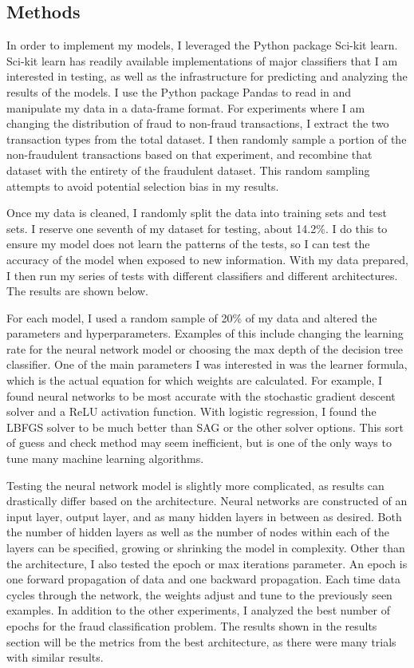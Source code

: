 \documentclass[midd]{thesis}
\begin{document}
\subsection{Methods}

In order to implement my models, I leveraged the Python package Sci-kit learn. Sci-kit learn has readily available implementations of major classifiers that I am interested in testing, as well as the infrastructure for predicting and analyzing the results of the models. I use the Python package Pandas to read in and manipulate my data in a data-frame format. For experiments where I am changing the distribution of fraud to non-fraud transactions, I extract the two transaction types from the total dataset. I then randomly sample a portion of the non-fraudulent transactions based on that experiment, and recombine that dataset with the entirety of the fraudulent dataset. This random sampling attempts to avoid potential selection bias in my results. 

Once my data is cleaned, I randomly split the data into training sets and test sets. I reserve one seventh of my dataset for testing, about 14.2\%. I do this to ensure my model does not learn the patterns of the tests, so I can test the accuracy of the model when exposed to new information. With my data prepared, I then run my series of tests with different classifiers and different architectures. The results are shown below. 

For each model, I used a random sample of 20\% of my data and altered the parameters and hyperparameters. Examples of this include changing the learning rate for the neural network model or choosing the max depth of the decision tree classifier. One of the main parameters I was interested in was the learner formula, which is the actual equation for which weights are calculated. For example, I found neural networks to be most accurate with the stochastic gradient descent solver and a ReLU activation function. With logistic regression, I found the LBFGS solver to be much better than SAG or the other solver options. This sort of guess and check method may seem inefficient, but is one of the only ways to tune many machine learning algorithms.

Testing the neural network model is slightly more complicated, as results can drastically differ based on the architecture. Neural networks are constructed of an input layer, output layer, and as many hidden layers in between as desired. Both the number of hidden layers as well as the number of nodes within each of the layers can be specified, growing or shrinking the model in complexity. Other than the architecture, I also tested the epoch or max iterations parameter. An epoch is one forward propagation of data and one backward propagation. Each time data cycles through the network, the weights adjust and tune to the previously seen examples. In addition to the other experiments, I analyzed the best number of epochs for the fraud classification problem. The results shown in the results section will be the metrics from the best architecture, as there were many trials with similar results.
\end{document}
